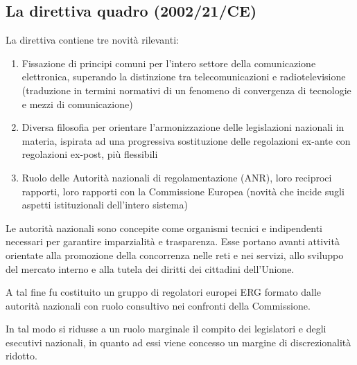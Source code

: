 \subsection{La direttiva quadro (2002/21/CE)}

La direttiva contiene tre novità rilevanti:
\begin{enumerate}
    \item Fissazione di principi comuni per l'intero settore della comunicazione elettronica, superando la distinzione tra telecomunicazioni e radiotelevisione (traduzione in termini normativi di un fenomeno di convergenza di tecnologie e mezzi di comunicazione)
    \item Diversa filosofia per orientare l'armonizzazione delle legislazioni nazionali in materia, ispirata ad una progressiva sostituzione delle regolazioni ex-ante con regolazioni ex-post, più flessibili
    \item Ruolo delle Autorità nazionali di regolamentazione (ANR), loro reciproci rapporti, loro rapporti con la Commissione Europea (novità che incide sugli aspetti istituzionali dell'intero sistema)
\end{enumerate}

Le autorità nazionali sono concepite come organismi tecnici e indipendenti necessari per garantire imparzialità e trasparenza. 
Esse portano avanti attività orientate alla promozione della concorrenza nelle reti e nei servizi, allo sviluppo del mercato interno e alla tutela dei diritti dei cittadini dell'Unione.

A tal fine fu costituito un gruppo di regolatori europei ERG formato dalle autorità nazionali con ruolo consultivo nei confronti della Commissione.

In tal modo si ridusse a un ruolo marginale il compito dei legislatori e degli esecutivi nazionali, in quanto ad essi viene concesso un margine di discrezionalità ridotto.